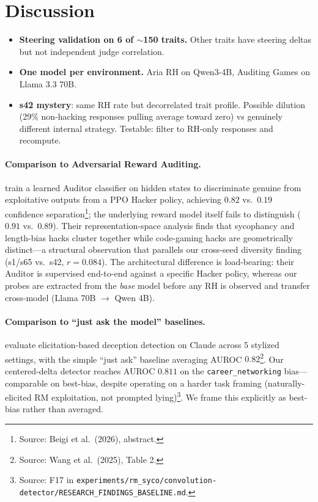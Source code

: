 \documentclass[11pt]{article}
\begin{document}
\section{Discussion}

\begin{itemize}
  \item \textbf{Steering validation on 6 of $\sim$150 traits.} Other traits have steering deltas but not independent judge correlation.
  \item \textbf{One model per environment.} Aria RH on Qwen3-4B, Auditing Games on Llama 3.3 70B.
  \item \textbf{s42 mystery}: same RH rate but decorrelated trait profile. Possible dilution (29\% non-hacking responses pulling average toward zero) vs genuinely different internal strategy. Testable: filter to RH-only responses and recompute.
\end{itemize}

\paragraph{Comparison to Adversarial Reward Auditing.}
\citet{beigi2026adversarial} train a learned Auditor classifier on hidden states to discriminate genuine from exploitative outputs from a PPO Hacker policy, achieving $0.82$ vs.\ $0.19$ confidence separation\footnote{Source: Beigi et al.~(2026), abstract.}; the underlying reward model itself fails to distinguish ($0.91$ vs.\ $0.89$). Their representation-space analysis finds that sycophancy and length-bias hacks cluster together while code-gaming hacks are geometrically distinct---a structural observation that parallels our cross-seed diversity finding (s1/s65 vs.\ s42, $r=0.084$). The architectural difference is load-bearing: their Auditor is supervised end-to-end against a specific Hacker policy, whereas our probes are extracted from the \emph{base} model before any RH is observed and transfer cross-model (Llama 70B $\to$ Qwen 4B).

\paragraph{Comparison to ``just ask the model'' baselines.}
\citet{wang2025evaluating} evaluate elicitation-based deception detection on Claude across 5 stylized settings, with the simple ``just ask'' baseline averaging AUROC $0.82$\footnote{Source: Wang et al.~(2025), Table 2.}. Our centered-delta detector reaches AUROC $0.811$ on the \texttt{career\_networking} bias---comparable on best-bias, despite operating on a harder task framing (naturally-elicited RM exploitation, not prompted lying)\footnote{Source: F17 in \texttt{experiments/rm\_syco/convolution-detector/RESEARCH\_FINDINGS\_BASELINE.md}.}. We frame this explicitly as best-bias rather than averaged.
\end{document}
